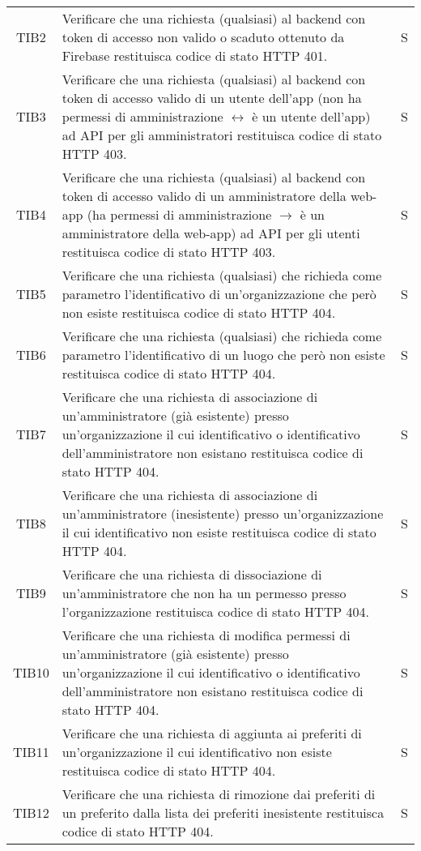 {\begin{longtable}{ c C{13cm} C{1cm}}
TIB2 & Verificare che una richiesta (qualsiasi) al backend con token di accesso non valido o scaduto ottenuto da Firebase restituisca codice di stato HTTP 401. & S \\
TIB3 & Verificare che una richiesta (qualsiasi) al backend con token di accesso valido di un utente dell'app (non ha permessi di amministrazione $\leftrightarrow$ è un utente dell'app) ad API per gli amministratori restituisca codice di stato HTTP 403. & S \\
TIB4 & Verificare che una richiesta (qualsiasi) al backend con token di accesso valido di un amministratore della web-app (ha permessi di amministrazione $\rightarrow$ è un amministratore della web-app) ad API per gli utenti restituisca codice di stato HTTP 403. & S \\
TIB5 & Verificare che una richiesta (qualsiasi) che richieda come parametro l'identificativo di un'organizzazione che però non esiste restituisca codice di stato HTTP 404. & S \\
TIB6 & Verificare che una richiesta (qualsiasi) che richieda come parametro l'identificativo di un luogo che però non esiste restituisca codice di stato HTTP 404. & S \\
TIB7 & Verificare che una richiesta di associazione di un'amministratore (già esistente) presso un'organizzazione il cui identificativo o identificativo dell'amministratore non esistano restituisca codice di stato HTTP 404. & S \\
TIB8 & Verificare che una richiesta di associazione di un'amministratore (inesistente) presso un'organizzazione il cui identificativo non esiste restituisca codice di stato HTTP 404. & S \\
TIB9 & Verificare che una richiesta di dissociazione di un'amministratore che non ha un permesso presso l'organizzazione restituisca codice di stato HTTP 404. & S \\
TIB10 & Verificare che una richiesta di modifica permessi di un'amministratore (già esistente) presso un'organizzazione il cui identificativo o identificativo dell'amministratore non esistano restituisca codice di stato HTTP 404. & S \\
TIB11 & Verificare che una richiesta di aggiunta ai preferiti di un'organizzazione il cui identificativo non esiste restituisca codice di stato HTTP 404. & S \\
TIB12 & Verificare che una richiesta di rimozione dai preferiti di un preferito dalla lista dei preferiti inesistente restituisca codice di stato HTTP 404. & S \\

\end{longtable}}
